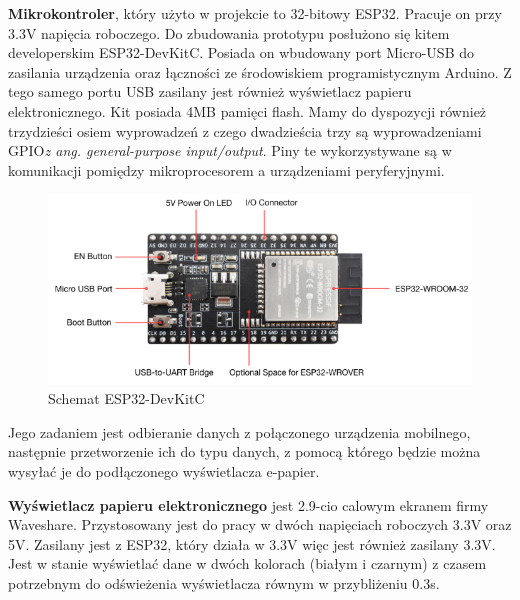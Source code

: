\documentclass[a4paper,12pt, twoside]{article}
\begin{document}
    	\textbf{Mikrokontroler}, który użyto w projekcie to 32-bitowy ESP32. Pracuje on przy 3.3V napięcia roboczego. Do zbudowania prototypu posłużono się kitem developerskim ESP32-DevKitC. Posiada on wbudowany port Micro-USB do zasilania urządzenia oraz łączności ze środowiskiem programistycznym Arduino. Z tego samego portu USB zasilany jest również wyświetlacz papieru elektronicznego. Kit posiada 4MB pamięci flash\cite{flash}. Mamy do dyspozycji również trzydzieści osiem wyprowadzeń z czego dwadzieścia trzy są wyprowadzeniami GPIO\textit{z ang. general-purpose input/output}. Piny te wykorzystywane są w komunikacji pomiędzy mikroprocesorem a urządzeniami peryferyjnymi.
    	\vspace{.5cm}
    	\begin{figure}[H]
    	        \centering
    			\vspace{.5cm}
    			\includegraphics[width=14cm]{images/rys8_devkit.png}
    			\vspace{.5cm}
    			\caption{Schemat ESP32-DevKitC\cite{devkit}}
                \label{fig:devkit}
    	\end{figure}
    	\vspace{.5cm}
    	Jego zadaniem jest odbieranie danych z połączonego urządzenia mobilnego, następnie przetworzenie ich do typu danych, z pomocą którego będzie można wysyłać je do podłączonego wyświetlacza e-papier.
    	
    	\vspace{1cm}
    
        \textbf{Wyświetlacz papieru elektronicznego} jest 2.9-cio calowym ekranem firmy Waveshare. Przystosowany jest do pracy w dwóch napięciach roboczych 3.3V oraz 5V. Zasilany jest z ESP32, który działa w 3.3V więc jest również zasilany 3.3V. Jest w stanie wyświetlać dane w dwóch kolorach (białym i czarnym) z czasem potrzebnym do odświeżenia wyświetlacza równym w przybliżeniu 0.3s\cite{waveshare}.
        
\end{document}
